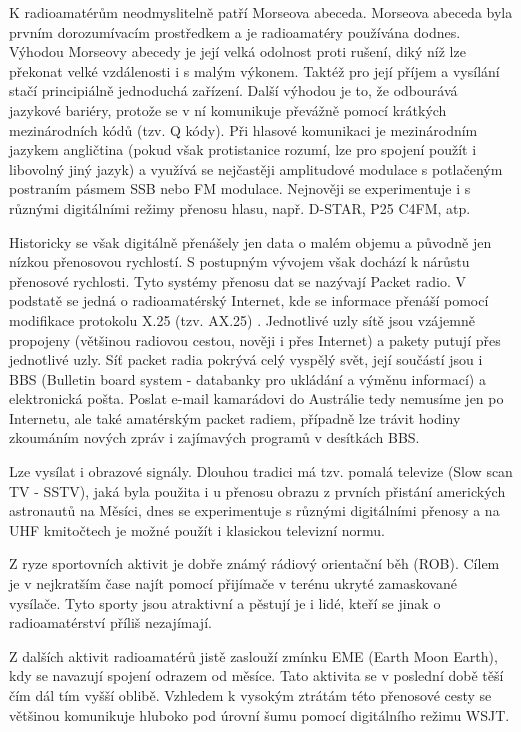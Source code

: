 K radioamatérům neodmyslitelně patří Morseova abeceda. Morseova abeceda byla
prvním dorozumívacím prostředkem a je radioamatéry používána dodnes.
Výhodou Morseovy %
abecedy je její velká odolnost proti rušení, diký níž lze překonat velké vzdálenosti i s malým
výkonem. Taktéž pro její příjem a vysílání stačí principiálně jednoduchá
zařízení. Další výhodou je to, že odbourává
jazykové bariéry, protože se v ní komunikuje
převážně pomocí krátkých mezinárodních kódů (tzv. Q kódy). Při hlasové komunikaci
je mezinárodním jazykem angličtina (pokud však protistanice rozumí, lze pro
spojení použít i libovolný jiný jazyk) a využívá se nejčastěji amplitudové
modulace s potlačeným postraním pásmem SSB
nebo FM modulace. Nejnověji se experimentuje i s různými digitálními režimy
přenosu hlasu, např. D-STAR, %
P25 C4FM, atp.

Historicky se však digitálně přenášely jen data o malém objemu a původně jen nízkou
přenosovou rychlostí. S postupným vývojem však dochází k nárůstu přenosové
rychlosti. Tyto systémy přenosu dat se nazývají Packet radio. V podstatě se jedná o
radioamatérský Internet, kde se informace přenáší pomocí modifikace protokolu
X.25 (tzv. AX.25) \cite{ax25}. %
Jednotlivé uzly sítě jsou vzájemně propojeny (většinou radiovou cestou, nověji i
přes Internet) a pakety putují přes jednotlivé uzly.
Síť packet radia pokrývá celý vyspělý svět, její součástí jsou i BBS (Bulletin
board system - databanky pro ukládání a výměnu informací) a
elektronická pošta. Poslat e-mail kamarádovi do Austrálie tedy nemusíme jen po Internetu,
ale také amatérským packet radiem, případně lze trávit hodiny zkoumáním nových zpráv i
zajímavých programů v desítkách BBS.

Lze vysílat i obrazové signály. Dlouhou tradici má tzv. pomalá televize (Slow
    scan TV - SSTV),
jaká byla použita i u přenosu obrazu z prvních přistání amerických astronautů na Měsíci,
dnes se experimentuje s různými digitálními přenosy a na UHF kmitočtech je možné
použít i klasickou televizní normu.

Z ryze sportovních aktivit je dobře známý rádiový
orientační běh (ROB). Cílem je v nejkratším čase najít pomocí
přijímače v terénu ukryté zamaskované vysílače. 
Tyto sporty jsou atraktivní a pěstují je i lidé, kteří se jinak o radioamatérství příliš nezajímají.

Z dalších aktivit radioamatérů jistě zaslouží zmínku EME (Earth Moon Earth), kdy
se navazují spojení odrazem od měsíce. Tato aktivita se v poslední době těší čím
dál tím vyšší oblibě. Vzhledem k vysokým ztrátám této přenosové cesty se
většinou komunikuje hluboko pod úrovní šumu pomocí digitálního režimu WSJT.

